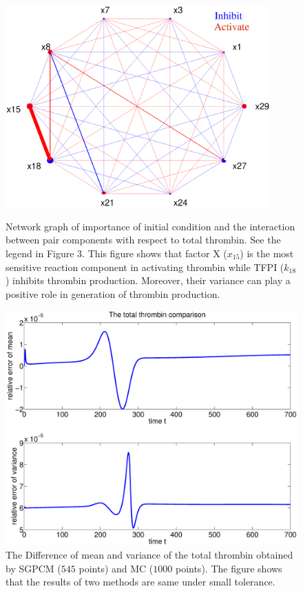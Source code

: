 \begin{figure}
\begin{center}
  \includegraphics[width=4in]{figures/nsaic.eps}
\caption{Network graph of importance of initial condition and the
interaction between pair components with respect to total thrombin.
See the legend in Figure 3. This figure shows that factor X
($x_{15}$) is the most sensitive reaction component in activating
thrombin while TFPI ($k_{18}$) inhibits thrombin production.
Moreover, their variance can play a positive role in generation of
thrombin production.} \label{Fig:nsaic}

  \includegraphics[width=5in]{figures/comp.eps}
\caption{The Difference of mean and variance of the total thrombin
obtained by SGPCM ($545$ points) and MC ($1000$ points). The figure
shows that the results of two methods are same under small
tolerance. %
 } \label{Fig:comp}


\end{center}
\end{figure}

